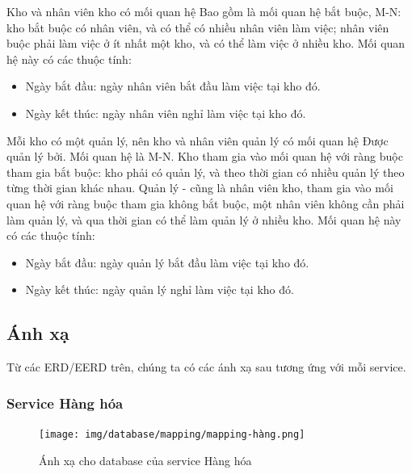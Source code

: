 \par Kho và nhân viên kho có mối quan hệ Bao gồm là mối quan hệ bắt buộc, M-N: kho bắt buộc có nhân viên, và có thể có nhiều nhân viên làm việc; nhân viên buộc phải làm việc ở ít nhất một kho, và có thể làm việc ở nhiều kho. Mối quan hệ này có các thuộc tính:
\begin{itemize}
    \item Ngày bắt đầu: ngày nhân viên bắt đầu làm việc tại kho đó.
    \item Ngày kết thúc: ngày nhân viên nghỉ làm việc tại kho đó.
\end{itemize}

\par Mỗi kho có một quản lý, nên kho và nhân viên quản lý có mối quan hệ Được quản lý bởi. Mối quan hệ là M-N. Kho tham gia vào mối quan hệ với ràng buộc tham gia bắt buộc: kho phải có quản lý, và theo thời gian có nhiều quản lý theo từng thời gian khác nhau. Quản lý - cũng là nhân viên kho, tham gia vào mối quan hệ với ràng buộc tham gia không bắt buộc, một nhân viên không cần phải làm quản lý, và qua thời gian có thể làm quản lý ở nhiều kho. Mối quan hệ này có các thuộc tính:
\begin{itemize}
    \item Ngày bắt đầu: ngày quản lý bắt đầu làm việc tại kho đó.
    \item Ngày kết thúc: ngày quản lý nghỉ làm việc tại kho đó.
\end{itemize}

\subsection{Ánh xạ}
\par Từ các ERD/EERD trên, chúng ta có các ánh xạ sau tương ứng với mỗi service.

\subsubsection{Service Hàng hóa}
\begin{figure}[!htp]
    \begin{center}
        \texttt{[image: img/database/mapping/mapping-hàng.png]}
        \newline
        \caption{Ánh xạ cho database của service Hàng hóa}
    \end{center}
\end{figure}

